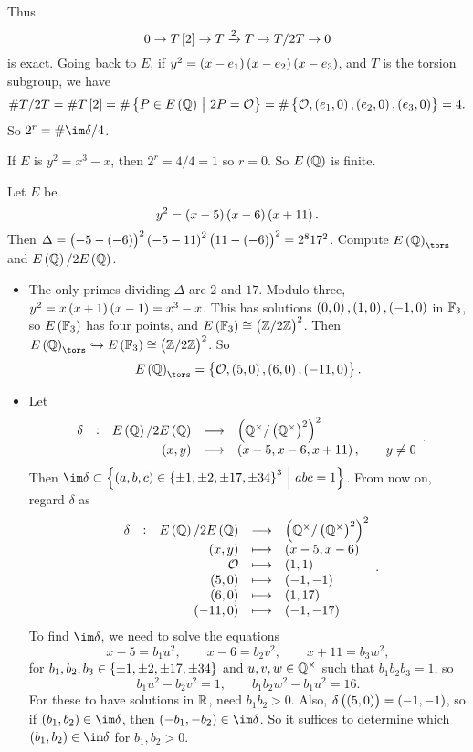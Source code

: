 Thus
$$ 0 \to T\sbr{2} \to T \xrightarrow{2} T \to T / 2T \to 0 $$
is exact. Going back to $ E $, if $ y^2 = \br{x - e_1}\br{x - e_2}\br{x - e_3} $, and $ T $ is the torsion subgroup, we have
$$ \#T / 2T = \#T\sbr{2} = \#\cbr{P \in E\br{\QQ} \st 2P = \OOO} = \#\cbr{\OOO, \br{e_1, 0}, \br{e_2, 0}, \br{e_3, 0}} = 4. $$
So $ 2^r = \#\im \delta / 4 $.

\begin{example*}
If $ E $ is $ y^2 = x^3 - x $, then $ 2^r = 4 / 4 = 1 $ so $ r = 0 $. So $ E\br{\QQ} $ is finite.
\end{example*}


\begin{example}
Let $ E $ be
$$ y^2 = \br{x - 5}\br{x - 6}\br{x + 11}. $$
Then $ \Delta = \br{-5 - \br{-6}}^2\br{-5 - 11}^2\br{11 - \br{-6}}^2 = 2^817^2 $. Compute $ E\br{\QQ}_{\tors} $ and $ E\br{\QQ} / 2E\br{\QQ} $.
\begin{itemize}
\item The only primes dividing $ \Delta $ are $ 2 $ and $ 17 $. Modulo three, $ y^2 = x\br{x + 1}\br{x - 1} = x^3 - x $. This has solutions $ \br{0, 0}, \br{1, 0}, \br{-1, 0} $ in $ \mathbb{F}_3 $, so $ E\br{\FF_3} $ has four points, and $ E\br{\FF_3} \cong \br{\ZZ / 2\ZZ}^2 $. Then $ E\br{\QQ}_{\tors} \hookrightarrow E\br{\FF_3} \cong \br{\ZZ / 2\ZZ}^2 $. So
$$ E\br{\QQ}_{\tors} = \cbr{\OOO, \br{5, 0}, \br{6, 0}, \br{-11, 0}}. $$
\item Let
$$ \function[\delta]{E\br{\QQ} / 2E\br{\QQ}}{\br{\QQ^\times / \br{\QQ^\times}^2}^2}{\br{x, y}}{\br{x - 5, x - 6, x + 11}, \qquad y \ne 0}. $$
Then $ \im \delta \subset \cbr{\br{a, b, c} \in \cbr{\pm 1, \pm 2, \pm 17, \pm 34}^3 \st abc = 1} $. From now on, regard $ \delta $ as
$$
\begin{array}{ccrcl}
\delta & : & E\br{\QQ} / 2E\br{\QQ} & \longrightarrow & \br{\QQ^\times / \br{\QQ^\times}^2}^2 \\
& & \br{x, y} & \longmapsto & \br{x - 5, x - 6} \\
& & \OOO & \longmapsto & \br{1, 1} \\
& & \br{5, 0} & \longmapsto & \br{-1, -1} \\
& & \br{6, 0} & \longmapsto & \br{1, 17} \\
& & \br{-11, 0} & \longmapsto & \br{-1, -17}
\end{array}.
$$
To find $ \im \delta $, we need to solve the equations
$$ x - 5 = b_1u^2, \qquad x - 6 = b_2v^2, \qquad x + 11 = b_3w^2, $$
for $ b_1, b_2, b_3 \in \cbr{\pm 1, \pm 2, \pm 17, \pm 34} $ and $ u, v, w \in \mathbb{Q}^\times $ such that $ b_1b_2b_3 = 1 $, so
$$ b_1u^2 - b_2v^2 = 1, \qquad b_1b_2w^2 - b_1u^2 = 16. $$
For these to have solutions in $ \mathbb{R} $, need $ b_1b_2 > 0 $. Also, $ \delta\br{\br{5, 0}} = \br{-1, -1} $, so if $ \br{b_1, b_2} \in \im \delta $, then $ \br{-b_1, -b_2} \in \im \delta $. So it suffices to determine which $ \br{b_1, b_2} \in \im \delta $ for $ b_1, b_2 > 0 $.


\end{itemize}
\end{example}
